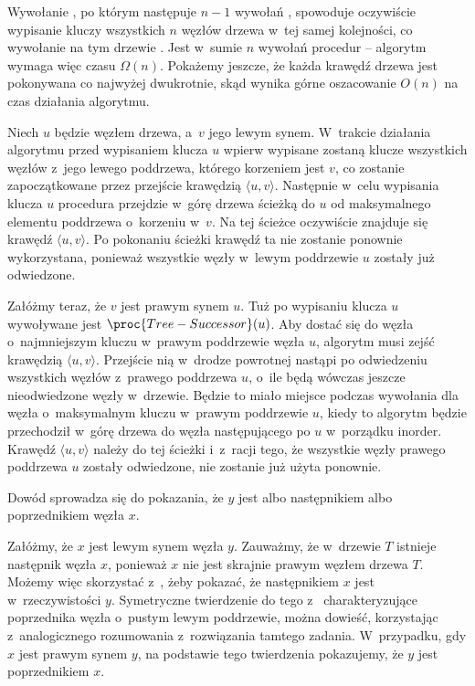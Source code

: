 \exercise %
Wywołanie , po którym następuje $n-1$ wywołań , spowoduje oczywiście wypisanie kluczy wszystkich $n$ węzłów drzewa w~tej samej kolejności, co wywołanie na tym drzewie .
Jest w~sumie $n$ wywołań procedur -- algorytm wymaga więc czasu $\Omega(n)$.
Pokażemy jeszcze, że każda krawędź drzewa jest pokonywana co najwyżej dwukrotnie, skąd wynika górne oszacowanie $O(n)$ na czas działania algorytmu.

Niech $u$ będzie węzłem drzewa, a~$v$ jego lewym synem.
W~trakcie działania algorytmu przed wypisaniem klucza $u$ wpierw wypisane zostaną klucze wszystkich węzłów z~jego lewego poddrzewa, którego korzeniem jest $v$, co zostanie zapoczątkowane przez przejście krawędzią $\langle u,v\rangle$.
Następnie w~celu wypisania klucza $u$ procedura  przejdzie w~górę drzewa ścieżką do $u$ od maksymalnego elementu poddrzewa o~korzeniu w~$v$.
Na tej ścieżce oczywiście znajduje się krawędź $\langle u,v\rangle$.
Po pokonaniu ścieżki krawędź ta nie zostanie ponownie wykorzystana, ponieważ wszystkie węzły w~lewym poddrzewie $u$ zostały już odwiedzone.

Załóżmy teraz, że $v$ jest prawym synem $u$.
Tuż po wypisaniu klucza $u$ wywoływane jest $\proc{Tree-Successor}(u)$.
Aby dostać się do węzła o~najmniejszym kluczu w~prawym poddrzewie węzła $u$, algorytm musi zejść krawędzią $\langle u,v\rangle$.
Przejście nią w~drodze powrotnej nastąpi po odwiedzeniu wszystkich węzłów z~prawego poddrzewa $u$, o~ile będą wówczas jeszcze nieodwiedzone węzły w~drzewie.
Będzie to miało miejsce podczas wywołania  dla węzła o~maksymalnym kluczu w~prawym poddrzewie $u$, kiedy to algorytm będzie przechodził w~górę drzewa do węzła następującego po $u$ w~porządku inorder.
Krawędź $\langle u,v\rangle$ należy do tej ścieżki i~z~racji tego, że wszystkie węzły prawego poddrzewa $u$ zostały odwiedzone, nie zostanie już użyta ponownie.

\exercise %
\exercise %
Dowód sprowadza się do pokazania, że $y$ jest albo następnikiem albo poprzednikiem węzła $x$.

Załóżmy, że $x$ jest lewym synem węzła $y$.
Zauważmy, że w~drzewie $T$ istnieje następnik węzła $x$, ponieważ $x$ nie jest skrajnie prawym węzłem drzewa $T$.
Możemy więc skorzystać z~, żeby pokazać, że następnikiem $x$ jest w~rzeczywistości $y$.
Symetryczne twierdzenie do tego z~ charakteryzujące poprzednika węzła o~pustym lewym poddrzewie, można dowieść, korzystając z~analogicznego rozumowania z~rozwiązania tamtego zadania.
W~przypadku, gdy $x$ jest prawym synem $y$, na podstawie tego twierdzenia pokazujemy, że $y$ jest poprzednikiem $x$.

